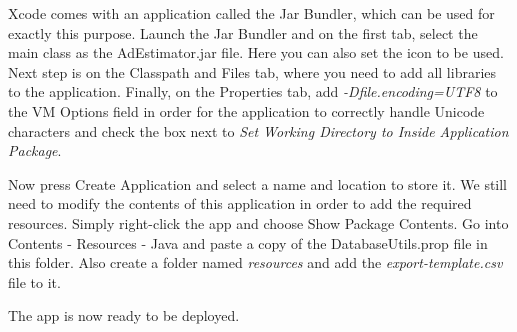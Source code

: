 \documentclass[11pt,twoside,a4paper]{article}
\begin{document}
Xcode comes with an application called the Jar Bundler, which can be used for exactly this purpose. Launch the Jar Bundler and on the first tab, select the main class as the AdEstimator.jar file. Here you can also set the icon to be used. Next step is on the Classpath and Files tab, where you need to add all libraries to the application. Finally, on the Properties tab, add \textit{-Dfile.encoding=UTF8} to the VM Options field in order for the application to correctly handle Unicode characters and check the box next to \textit{Set Working Directory to Inside Application Package}.

Now press Create Application and select a name and location to store it. We still need to modify the contents of this application in order to add the required resources. Simply right-click the app and choose Show Package Contents. Go into Contents - Resources - Java and paste a copy of the DatabaseUtils.prop file in this folder. Also create a folder named \textit{resources} and add the \textit{export-template.csv} file to it.

The app is now ready to be deployed.
\end{document}
